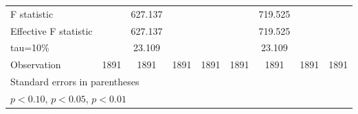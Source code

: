 \begin{tabular}{l*{8}{c}}
\hline
F statistic         &                     &     627.137         &                     &                     &                     &     719.525         &                     &                     \\
Effective F statistic&                     &     627.137         &                     &                     &                     &     719.525         &                     &                     \\
tau=10\%            &                     &      23.109         &                     &                     &                     &      23.109         &                     &                     \\
Observation         &        1891         &        1891         &        1891         &        1891         &        1891         &        1891         &        1891         &        1891         \\
\bottomrule \multicolumn{9}{l}{\footnotesize Standard errors in parentheses}\\ \multicolumn{8}{l}{\footnotesize \sym{*} \(p<0.10\), \sym{**} \(p<0.05\), \sym{***} \(p<0.01\)} \end{tabular}
